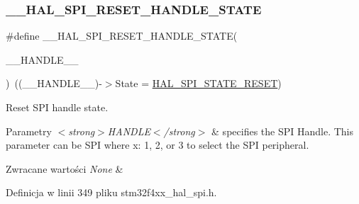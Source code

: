 \subsubsection{\texorpdfstring{\+\_\+\+\_\+\+H\+A\+L\+\_\+\+S\+P\+I\+\_\+\+R\+E\+S\+E\+T\+\_\+\+H\+A\+N\+D\+L\+E\+\_\+\+S\+T\+A\+TE}{\_\_HAL\_SPI\_RESET\_HANDLE\_STATE}}
{\footnotesize\ttfamily \#define \+\_\+\+\_\+\+H\+A\+L\+\_\+\+S\+P\+I\+\_\+\+R\+E\+S\+E\+T\+\_\+\+H\+A\+N\+D\+L\+E\+\_\+\+S\+T\+A\+TE(\begin{DoxyParamCaption}\item[{}]{\+\_\+\+\_\+\+H\+A\+N\+D\+L\+E\+\_\+\+\_\+ }\end{DoxyParamCaption})~((\+\_\+\+\_\+\+H\+A\+N\+D\+L\+E\+\_\+\+\_\+)-\/$>$State = \hyperlink{group___s_p_i___exported___types_gga8891cb64e76198a860172d94c638c9b4adbc218df2c9841b561282b40b3ded69d}{H\+A\+L\+\_\+\+S\+P\+I\+\_\+\+S\+T\+A\+T\+E\+\_\+\+R\+E\+S\+ET})}



Reset S\+PI handle state. 


\begin{DoxyParams}{Parametry}
{\em $<$strong$>$\+H\+A\+N\+D\+L\+E$<$/strong$>$} & specifies the S\+PI Handle. This parameter can be S\+PI where x\+: 1, 2, or 3 to select the S\+PI peripheral. \\
\hline
\end{DoxyParams}

\begin{DoxyRetVals}{Zwracane wartości}
{\em None} & \\
\hline
\end{DoxyRetVals}


Definicja w linii 349 pliku stm32f4xx\+\_\+hal\+\_\+spi.\+h.

